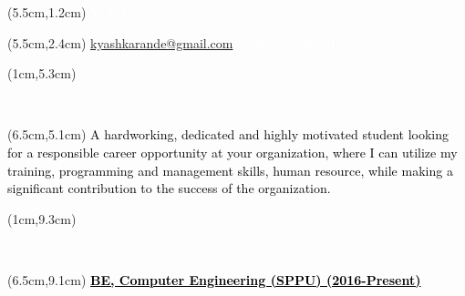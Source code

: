 \documentclass[10pt,a4paper,twocolumn]{article}
\begin{document}
\begin{center}
\begin{textblock*}{10cm}(5.5cm,1.2cm)
   \textcolor{white}{\fontsize{30}{40}\selectfont Yash Karande}
\end{textblock*}
\begin{textblock*}{10cm}(5.5cm,2.4cm)
\textcolor{white}{\fontsize{12}{15}\selectfont \href {mailto:kyashkarande@gmail.com} {kyashkarande@gmail.com} | +91-8668230701}
\end{textblock*}
\end{center}
\begin{textblock*}{3.9cm}(1cm,5.3cm)
   \begin{mdframed}[style=Frame1]
   \textcolor{white}{\fontsize{20}{20}\selectfont Summary }
   \end{mdframed}
\end{textblock*}
\begin{textblock*}{14cm}(6.5cm,5.1cm)
   \textcolor{black}{\fontsize{15}{20}\selectfont A hardworking, dedicated and highly motivated student looking for a responsible career opportunity at your organization, where I can utilize my training, programming and management skills, human resource, while making a significant contribution to the success of the organization.}
\end{textblock*}
\begin{textblock*}{4cm}(1cm,9.3cm)
   \begin{mdframed}[style=Frame1]
   \textcolor{white}{\fontsize{20}{20}\selectfont Education}
   \end{mdframed}
\end{textblock*}
\begin{textblock*}{14cm}(6.5cm,9.1cm)
   \textcolor{black}{\fontsize{15}{20}\selectfont \underline{\textbf{BE, Computer Engineering (SPPU) \hspace{20mm}(2016-Present)}}\vspace{1mm} }
\end{textblock*}
\end{document}
